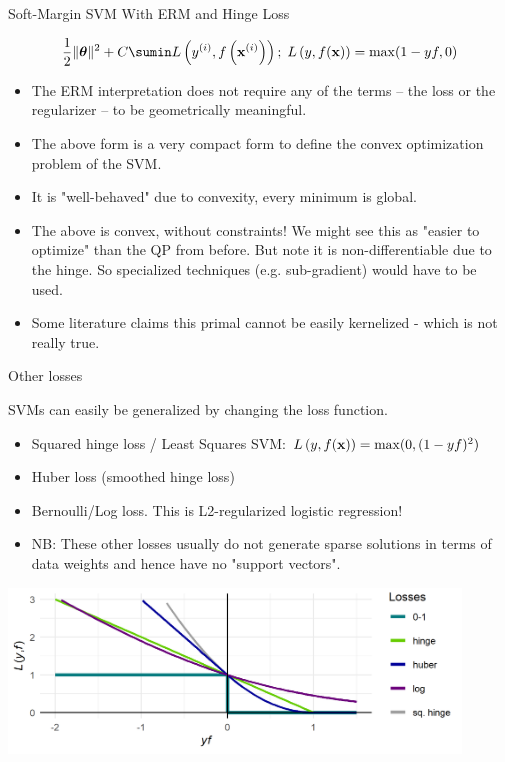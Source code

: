 \documentclass[11pt,compress,t,notes=noshow, xcolor=table]{beamer}
\begin{document}
\begin{vbframe}{Soft-Margin SVM With ERM and Hinge Loss}
\framebreak

  $$ \frac{1}{2} \|\thetav\|^2 + C \sumin \Lxyi ;\; \Lxy = \max(1-yf, 0)$$
\begin{itemize}
 \item  The ERM interpretation does not require any of the terms -- the loss or the regularizer -- to be geometrically meaningful.
  \item The above form is a very compact form to define the convex optimization problem of the SVM. 
  \item It is "well-behaved" due to convexity, every minimum is global.
  \item The above is convex, without constraints! We might see this as "easier to optimize" than the QP from before. But note it is non-differentiable due to the hinge. 
    So specialized techniques (e.g. sub-gradient) would have to be used. 
  \item Some literature claims this primal cannot be easily kernelized - which is not really true.
  \end{itemize}
\end{vbframe}

\begin{vbframe}{Other losses}

  SVMs can easily be generalized by changing the loss function.
  \begin{itemize}
    \item Squared hinge loss / Least Squares SVM: $L\left(y, f(\mathbf{x})\right) = \max(0, (1 - yf)^2)$ 
    \item Huber loss (smoothed hinge loss)
    \item Bernoulli/Log loss. This is L2-regularized logistic regression!
    \item NB: These other losses usually do not generate sparse solutions in terms of 
      data weights and hence have no "support vectors".
  \end{itemize}


\begin{center}
\includegraphics[width = 0.9\textwidth]{figure/other_losses.png} \\
\end{center}


\end{vbframe}


\endlecture
\end{document}
